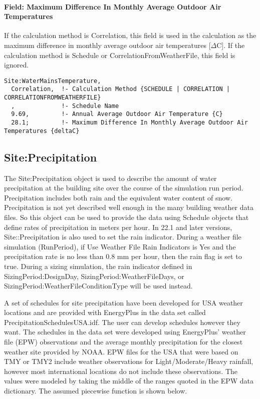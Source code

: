 \paragraph{Field: Maximum Difference In Monthly Average Outdoor Air Temperatures}\label{field-maximum-difference-in-monthly-average-outdoor-air-temperatures}

If the calculation method is Correlation, this field is used in the calculation as the maximum difference in monthly average outdoor air temperatures {[}\(\Delta\)C{]}. If the calculation method is Schedule or CorrelationFromWeatherFile, this field is ignored.

\begin{lstlisting}
Site:WaterMainsTemperature,
  Correlation,  !- Calculation Method {SCHEDULE | CORRELATION | CORRELATIONFROMWEATHERFILE}
  ,             !- Schedule Name
  9.69,         !- Annual Average Outdoor Air Temperature {C}
  28.1;         !- Maximum Difference In Monthly Average Outdoor Air Temperatures {deltaC}
\end{lstlisting}

\subsection{Site:Precipitation}\label{siteprecipitation}

The Site:Precipitation object is used to describe the amount of water
precipitation at the building site over the course of the simulation run period.
Precipitation includes both rain and the equivalent water content of snow.
Precipitation is not yet described well enough in the many building weather data
files. So this object can be used to provide the data using Schedule objects
that define rates of precipitation in meters per hour. In 22.1 and later
versions, Site::Precipitation is also used to set the rain indicator. During a
weather file simulation (RunPeriod), if Use Weather File Rain Indicators is Yes
and the precipitation rate is no less than 0.8 mm per hour, then the rain flag
is set to true. During a sizing simulation, the rain indicator defined in
SizingPeriod:DesignDay, SizingPeriod:WeatherFileDays, or
SizingPeriod:WeatherFileConditionType will be used instead.

A set of schedules for site precipitation have been developed for USA weather locations and are provided with EnergyPlus in the data set called PrecipitationSchedulesUSA.idf. The user can develop schedules however they want. The schedules in the data set were developed using EnergyPlus' weather file (EPW) observations and the average monthly precipitation for the closest weather site provided by NOAA. EPW files for the USA that were based on TMY or TMY2 include weather observations for Light/Moderate/Heavy rainfall, however most international locations do not include these observations. The values were modeled by taking the middle of the ranges quoted in the EPW data dictionary. The assumed piecewise function is shown below.

